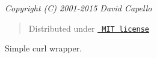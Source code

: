 {\itshape Copyright (C) 2001-\/2015 David Capello}

\begin{quote}
Distributed under \href{LICENSE.txt}{\texttt{ MIT license}} \end{quote}
Simple curl wrapper. 